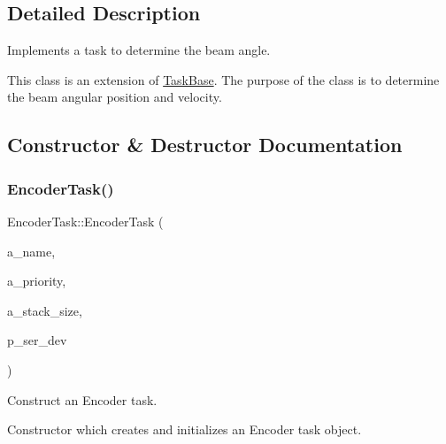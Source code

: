 \subsection{Detailed Description}
Implements a task to determine the beam angle. 

This class is an extension of {\ttfamily \mbox{\hyperlink{class_task_base}{Task\+Base}}}. The purpose of the class is to determine the beam angular position and velocity. 

\subsection{Constructor \& Destructor Documentation}
\mbox{\label{class_encoder_task_af40f2d1f64b159deed631cf6fd7ad26f}} 
\subsubsection{\texorpdfstring{Encoder\+Task()}{EncoderTask()}}
{\footnotesize\ttfamily Encoder\+Task\+::\+Encoder\+Task (\begin{DoxyParamCaption}\item[{const char $\ast$}]{a\+\_\+name,  }\item[{unsigned port\+B\+A\+S\+E\+\_\+\+T\+Y\+PE}]{a\+\_\+priority,  }\item[{size\+\_\+t}]{a\+\_\+stack\+\_\+size,  }\item[{\mbox{\hyperlink{classemstream}{emstream}} $\ast$}]{p\+\_\+ser\+\_\+dev }\end{DoxyParamCaption})}



Construct an Encoder task. 

Constructor which creates and initializes an Encoder task object.

